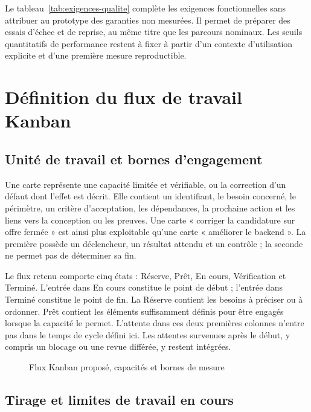 Le tableau~\ref{tab:exigences-qualite} complète les exigences fonctionnelles sans attribuer au prototype des garanties non mesurées. Il permet de préparer des essais d'échec et de reprise, au même titre que les parcours nominaux. Les seuils quantitatifs de performance restent à fixer à partir d'un contexte d'utilisation explicite et d'une première mesure reproductible.

\section{Définition du flux de travail Kanban}
\label{sec:flux-kanban}

\subsection{Unité de travail et bornes d'engagement}

Une carte représente une capacité limitée et vérifiable, ou la correction d'un défaut dont l'effet est décrit. Elle contient un identifiant, le besoin concerné, le périmètre, un critère d'acceptation, les dépendances, la prochaine action et les liens vers la conception ou les preuves. Une carte « corriger la candidature sur offre fermée » est ainsi plus exploitable qu'une carte « améliorer le backend ». La première possède un déclencheur, un résultat attendu et un contrôle ; la seconde ne permet pas de déterminer sa fin.

Le flux retenu comporte cinq états : Réserve, Prêt, En cours, Vérification et Terminé. L'entrée dans En cours constitue le point de début ; l'entrée dans Terminé constitue le point de fin. La Réserve contient les besoins à préciser ou à ordonner. Prêt contient les éléments suffisamment définis pour être engagés lorsque la capacité le permet. L'attente dans ces deux premières colonnes n'entre pas dans le temps de cycle défini ici. Les attentes survenues après le début, y compris un blocage ou une revue différée, y restent intégrées.

\begin{figure}[htbp]
\centering
\resizebox{\textwidth}{!}{}
\caption{Flux Kanban proposé, capacités et bornes de mesure}
\label{fig:kanban-board}
\end{figure}

\subsection{Tirage et limites de travail en cours}

